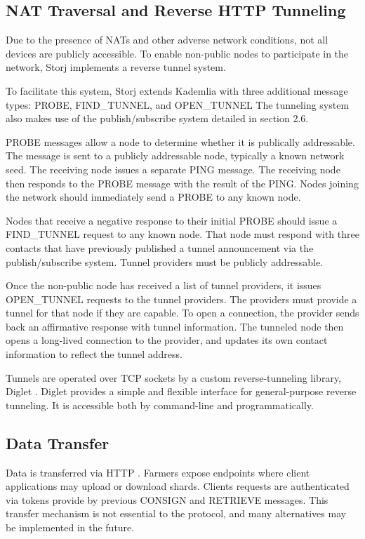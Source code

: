 \documentclass[a4paper,10pt]{article}
\begin{document}
\subsection{NAT Traversal and Reverse HTTP Tunneling}
Due to the presence of NATs and other adverse network conditions, not all devices are publicly accessible. To enable non-public nodes to participate in the network, Storj implements a reverse tunnel system.

To facilitate this system, Storj extends Kademlia with three additional message types: PROBE, FIND\_TUNNEL, and OPEN\_TUNNEL The tunneling system also makes use of the publish/subscribe system detailed in section 2.6.

PROBE messages allow a node to determine whether it is publically addressable. The message is sent to a publicly addressable node, typically a known network seed. The receiving node issues a separate PING message. The receiving node then responds to the PROBE message with the result of the PING. Nodes joining the network should immediately send a PROBE to any known node.

Nodes that receive a negative response to their initial PROBE should issue a FIND\_TUNNEL request to any known node. That node must respond with three contacts that have previously published a tunnel announcement via the publish/subscribe system. Tunnel providers must be publicly addressable.

Once the non-public node has received a list of tunnel providers, it issues OPEN\_TUNNEL requests to the tunnel providers. The providers must provide a tunnel for that node if they are capable. To open a connection, the provider sends back an affirmative response with tunnel information. The tunneled node then opens a long-lived connection to the provider, and updates its own contact information to reflect the tunnel address.

Tunnels are operated over TCP sockets by a custom reverse-tunneling library, Diglet \cite{14}. Diglet provides a simple and flexible interface for general-purpose reverse tunneling. It is accessible both by command-line and programmatically.

\subsection{Data Transfer}
Data is transferred via HTTP \cite{15}. Farmers expose endpoints where client applications may upload or download shards. Clients requests are authenticated via tokens provide by previous CONSIGN and RETRIEVE messages. This transfer mechanism is not essential to the protocol, and many alternatives may be implemented in the future.
\end{document}
